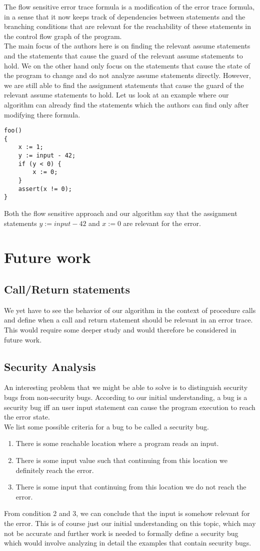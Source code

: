 \documentclass{article}
\begin{document}
The flow sensitive error trace formula is a modification of the error trace formula, in a sense that it now keeps track of dependencies between statements and the branching conditions that are relevant for the reachability of these statements in the control flow graph of the program. \\
The main focus of the authors here is on finding the relevant assume statements and the statements that cause the guard of the relevant assume statements to hold. We on the other hand only focus on the statements that cause the state of the program to change and do not analyze assume statements directly. However, we are still able to find the assignment statements that cause the guard of the relevant assume statements to hold. Let us look at an example where our algorithm can already find the statements which the authors can find only after modifying there formula. 
\begin{lstlisting}
foo()
{
	x := 1;
	y := input - 42;
	if (y < 0) {
		x := 0;	
	}
	assert(x != 0);
}
\end{lstlisting}
Both the flow sensitive approach and our algorithm say that the assignment statements $y := input - 42$ and $x := 0$ are relevant for the error.
\section{Future work}
\subsection{Call/Return statements}
We yet have to see the behavior of our algorithm in the context of procedure calls and define when a call and return statement should be relevant in an error trace. This would require some deeper study and would therefore be considered in future work.
\subsection{Security Analysis}
An interesting problem that we might be able to solve is to distinguish security bugs from non-security bugs. According to our initial understanding, a bug is a security bug iff an user input statement can cause the program execution to reach the error state. \\
We list some possible criteria for a bug to be called a security bug.
\begin{enumerate}
  \item There  is some reachable location where a program reads an input.
  \item There is some input value such that continuing from this location we definitely reach the error.
  \item There is some input that continuing from this location we do not reach the error.
\end{enumerate}
From condition 2 and 3, we can conclude that the input is somehow relevant for the error. This is of course just our initial understanding on this topic, which may not be accurate and further work is needed to formally define a security bug which would involve analyzing in detail the examples that contain security bugs.
\newpage


\end{document}
